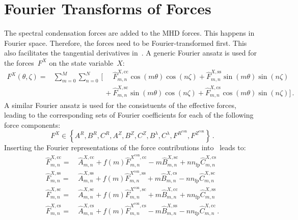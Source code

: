 \section{Fourier Transforms of Forces}
The spectral condensation forces are added to the MHD forces.
This happens in Fourier space. Therefore, the forces need to be Fourier-transformed first.
This also facilitates the tangential derivatives in~.
A generic Fourier ansatz is used for the forces~$F^X$ on the state variable~$X$:
\begin{align}
  F^X(\theta, \zeta)
  =&          \sum_{m=0}^M \sum_{n=0}^N \,\Biggl[ \phantom{+}\, \hat{F}_{m,n}^{X,\mathrm{cc}} \cos(m \theta) \cos(n \zeta)
                                                           +    \hat{F}_{m,n}^{X,\mathrm{ss}} \sin(m \theta) \sin(n \zeta) \nonumber \\
  ~& \phantom{\sum_{m=0}^M \sum_{n=0}^N \,\Biggl[}\,       +    \hat{F}_{m,n}^{X,\mathrm{sc}} \sin(m \theta) \cos(n \zeta)
                                                           +    \hat{F}_{m,n}^{X,\mathrm{cs}} \cos(m \theta) \sin(n \zeta) \Biggr] \, .
\end{align}
A similar Fourier ansatz is used for the consistuents of the effective forces,
leading to the corresponding sets of Fourier coefficients for each of the following force components:
\begin{equation}
  F^X \in \left\{ A^R, B^R, C^R, A^Z, B^Z, C^Z, B^\lambda, C^\lambda, F^{R^\mathrm{con}}, F^{Z^\mathrm{con}} \right\} \label{eqn:all_forces} \, .
\end{equation}
Inserting the Fourier representations of the force contributions into~ leads to:
\begin{align}
  \hat{F}_{m,n}^{X,\mathrm{cc}} =&\, \hat{A}_{m,n}^{X,\mathrm{cc}} + f(m) \hat{F}_{m,n}^{X^\mathrm{con},\mathrm{cc}} - m \hat{B}_{m,n}^{X,\mathrm{sc}} + n n_\mathrm{fp} \hat{C}_{m,n}^{X,\mathrm{cs}} \label{eqn:f_x_cc} \\
  \hat{F}_{m,n}^{X,\mathrm{ss}} =&\, \hat{A}_{m,n}^{X,\mathrm{ss}} + f(m) \hat{F}_{m,n}^{X^\mathrm{con},\mathrm{ss}} + m \hat{B}_{m,n}^{X,\mathrm{cs}} - n n_\mathrm{fp} \hat{C}_{m,n}^{X,\mathrm{sc}} \\
  \hat{F}_{m,n}^{X,\mathrm{sc}} =&\, \hat{A}_{m,n}^{X,\mathrm{sc}} + f(m) \hat{F}_{m,n}^{X^\mathrm{con},\mathrm{sc}} + m \hat{B}_{m,n}^{X,\mathrm{cc}} + n n_\mathrm{fp} \hat{C}_{m,n}^{X,\mathrm{ss}} \\
  \hat{F}_{m,n}^{X,\mathrm{cs}} =&\, \hat{A}_{m,n}^{X,\mathrm{cs}} + f(m) \hat{F}_{m,n}^{X^\mathrm{con},\mathrm{cs}} - m \hat{B}_{m,n}^{X,\mathrm{ss}} - n n_\mathrm{fp} \hat{C}_{m,n}^{X,\mathrm{cc}} \label{eqn:f_x_cs} \, .
\end{align}
